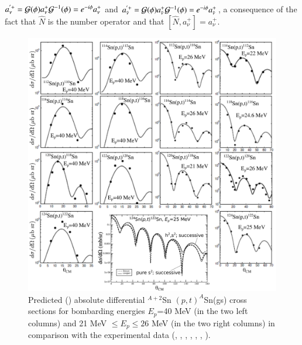 $a^{'+}_{\nu} = {\cal G} (\phi) a^+_{\nu} {\cal G}^{-1} (\phi)= e^{- i \phi} a^+_{\nu}$ and 
$a^{'+}_{\bar \nu} = {\cal G} (\phi) a^+_{\bar \nu} {\cal G}^{-1} (\phi)= e^{- i \phi} a^+_{\bar \nu}$, a consequence of the fact that $\hat N$ is the number operator and that $[\hat N, a^+_{\nu}] = a^+_{\nu}$.
  \begin{figure}
  \centerline{\includegraphics*[width=12cm,angle=0]{C8/figsC8/fig8_2_4}}
  	\caption{Predicted (\cite{Potel:13,Potel:13b}) absolute differential $^{A+2}$Sn $(p,t)^A$Sn(gs) cross sections for bombarding
  	energies $E_p$=40 MeV (in the two left columns) and 21 MeV $\leq E_p \leq 26$ MeV (in the two right columns) in comparison with the
  	experimental data (\cite{Bassani:65}, \cite{Guazzoni:99}, \cite{Guazzoni:04}, \cite{Guazzoni:06}, \cite{Guazzoni:08}, \cite{Guazzoni:11}, \cite{Guazzoni:12}).}\label{fig8_2_4}
  \end{figure}
  



